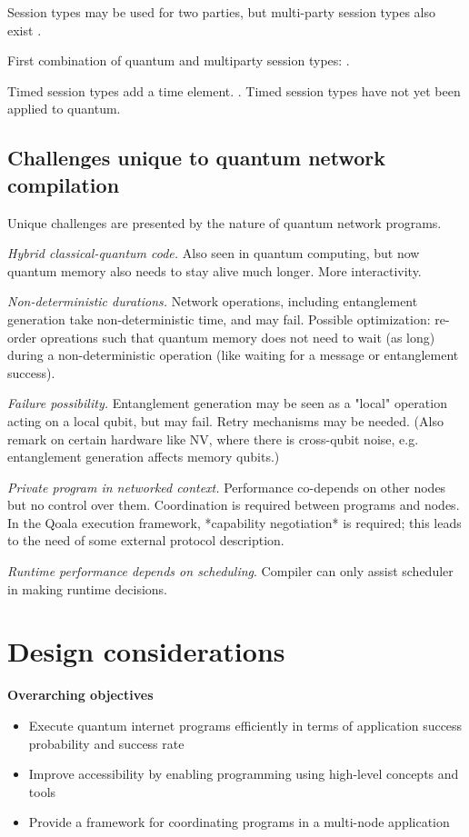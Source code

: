 Session types may be used for two parties, but multi-party session types also exist \cite{honda_multiparty_2016}.

First combination of quantum and multiparty session types: \cite{lanese_towards_2024}.

Timed session types add a time element. \cite{bartoletti_timed_2017}.
Timed session types have not yet been applied to quantum.


\subsection{Challenges unique to quantum network compilation}
Unique challenges are presented by the nature of quantum network programs.

\textit{Hybrid classical-quantum code.} Also seen in quantum computing, but now quantum memory also needs to stay alive much longer. More interactivity.

\textit{Non-deterministic durations.} Network operations, including entanglement generation take non-deterministic time, and may fail.
Possible optimization: re-order opreations such that quantum memory does not need to wait (as long) during a non-deterministic operation (like waiting for a message or entanglement success).

\textit{Failure possibility.} Entanglement generation may be seen as a "local" operation acting on a local qubit, but may fail. Retry mechanisms may be needed.
(Also remark on certain hardware like NV, where there is cross-qubit noise, e.g. entanglement generation affects memory qubits.)

\textit{Private program in networked context.} Performance co-depends on other nodes but no control over them. Coordination is required between programs and nodes.
In the Qoala execution framework, *capability negotiation* is required; this leads to the need of some external protocol description.

\textit{Runtime performance depends on scheduling}. Compiler can only assist scheduler in making runtime decisions.




\section{Design considerations}

\textbf{Overarching objectives}
\begin{itemize}
\item Execute quantum internet programs efficiently in terms of application success probability and success rate
\item Improve accessibility by enabling programming using high-level concepts and tools
\item Provide a framework for coordinating programs in a multi-node application
\end{itemize}

